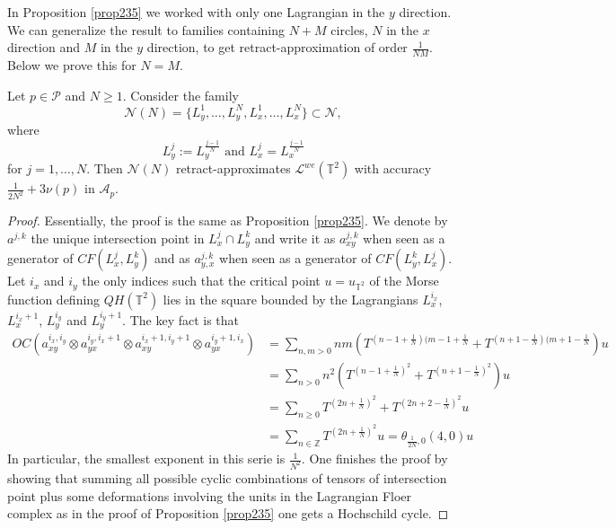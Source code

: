 
In Proposition \ref{prop235} we worked with only one Lagrangian in the $y$ direction. We can generalize the result to families containing $N+M$ circles, $N$ in the $x$ direction and $M$ in the $y$ direction, to get retract-approximation of order $\frac{1}{NM}$. Below we prove this for $N=M$.

\begin{prop}
	Let $p\in \mathcal{P}$ and $N\geq 1$. Consider the family $$\mathcal{N}(N)= \{L^1_y,\ldots, L_y^N,L_x^1,\ldots, L_x^N\}\subset \mathcal{N},$$ where $$L_y^j:= L_y^{\frac{j-1}{N}}\text{    and    }L_x^j=L_x^{\frac{j-1}{N}}$$ for $j=1,\ldots, N$. Then $\mathcal{N}(N)$ retract-approximates $\mathcal{L}^{we}(\mathbb{T}^2)$ with accuracy $\frac{1}{2N^2}+ 3\nu(p)$ in $\mathcal{A}_p$.
\end{prop}
\begin{proof}
	Essentially, the proof is the same as Proposition \ref{prop235}. We denote by $a^{j,k}$ the unique intersection point in $L_x^j\cap L_y^k$ and write it as $a^{j,k}_{xy}$ when seen as a generator of $CF(L_x^j,L_y^k)$ and as $a^{j,k}_{y,x}$ when seen as a generator of $CF(L_y^k,L_x^j)$. Let $i_x$ and $i_y$ the only indices such that the critical point $u=u_{\mathbb{T}^2}$ of the Morse function defining $QH(\mathbb{T}^2)$ lies in the square bounded by the Lagrangians $L_x^{i_x}$, $L_x^{i_x+1}$, $L_y^{i_y}$ and $L_y^{i_y+1}$. The key fact is that 
	\begin{align*}
		OC(a^{i_x,i_y}_{xy}\otimes a^{i_y,i_x+1}_{yx}\otimes a^{i_x+1,i_y+1}_{xy}\otimes a^{i_y+1,i_x}_{yx})&=\sum_{n,m>0}nm(T^{(n-1+\frac{1}{N})(m-1+\frac{1}{N}}+T^{(n+1-\frac{1}{N})(m+1-\frac{1}{N}})u \\& =\sum_{n>0}n^2(T^{(n-1+\frac{1}{N})^2}+T^{(n+1-\frac{1}{N})^2})u\\ & = \sum_{n\geq 0}T^{(2n+\frac{1}{N})^2}+T^{(2n+2-\frac{1}{N})^2}u\\ & = \sum_{n\in \mathbb{Z}}T^{(2n+\frac{1}{N})^2 }u= \theta_{\frac{1}{2N},0}(4,0)u
	\end{align*} In particular, the smallest exponent in this serie is $\frac{1}{N^2}$. One finishes the proof by showing that summing all possible cyclic combinations of tensors of intersection point plus some deformations involving the units in the Lagrangian Floer complex as in the proof of Proposition \ref{prop235} one gets a Hochschild cycle.
\end{proof}


